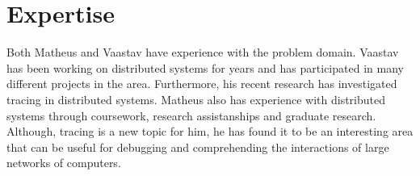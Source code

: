 \section{Expertise}

Both Matheus and Vaastav have experience with the problem domain. 
Vaastav has been working on distributed systems for years and has 
participated in many different projects in the area. Furthermore, his recent research has investigated
tracing in distributed systems.
Matheus also has experience with distributed systems through coursework,
research assistanships and graduate research. Although, tracing is a new topic for him, he has found it to be
an interesting area that can be useful for debugging and comprehending the interactions of large networks
of computers.